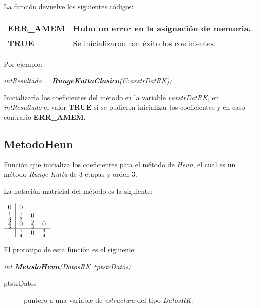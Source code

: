 La funci\'on devuelve los siguientes c\'odigos:

\begin{center}
\begin{tabular}{|l|l|}
\hline
\textbf{ERR\_AMEM} & Hubo un error en la asignaci\'on de memoria. \\
\hline
\textbf{TRUE} & Se inicializaron con \'exito los coeficientes. \\
\hline
\end{tabular}
\end{center}

Por ejemplo:

\begin{center}
\emph{intResultado = \textbf{RungeKuttaClasico}(\&varstrDatRK);}
\end{center}

Inicializar\'{\i}a los coeficientes del m\'etodo en la variable 
\emph{varstrDatRK}, en \emph{intResultado} el valor \textbf{TRUE} si se pudieron
inicializar los coeficientes y en caso contrario \textbf{ERR\_AMEM}.

\subsection{MetodoHeun}
Funci\'on que inicializa los coeficientes para el m\'etodo de \emph{Heun}, el
cual es un m\'etodo \emph{Runge-Kutta} de $3$ etapas y orden $3$.\newline

La notaci\'on matricial del m\'etodo es la siguiente:

\begin{center}
$
\begin{array}{c|ccc}
0 & 0 \\
\frac{1}{3} & \frac{1}{3} & 0 \\
\frac{2}{3} & 0 & \frac{2}{3} & 0 \\
\hline
 & \frac{1}{4} & 0 & \frac{3}{4}
\end{array}
$
\end{center}

El prototipo de esta funci\'on es el siguiente:

\begin{center}
\emph{int \textbf{MetodoHeun}(DatosRK *ptstrDatos)}
\end{center}

\begin{description}
\item[ptstrDatos] puntero a una variable de \emph{estructura} del tipo
\emph{DatosRK}.
\end{description}

